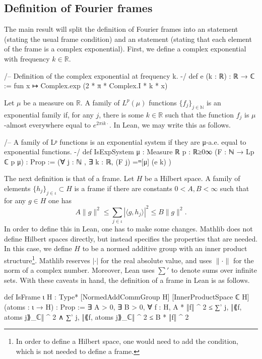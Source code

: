 \documentclass[reqno,a4paper,12pt]{amsart}
\def\R{{\mathbb R}}
\begin{document}
\subsection{Definition of Fourier frames}
\label{sec:fourier_frames}
The main result will split the definition of Fourier frames into an  statement (stating the usual frame condition) and an  statement (stating that each element of the frame is a complex exponential). First, we define a complex exponential with frequency $k \in \R$.

\begin{leancode}
/-- Definition of the complex exponential at frequency k. -/
def e (k : ℝ) : ℝ → ℂ := 
  fun x ↦ Complex.exp (2 * π * Complex.I * k * x)
\end{leancode}

Let $\mu$ be a measure on $\mathbb{R}$. A family of $L^p(\mu)$ functions $\{f_j\}_{j\in \mathbb{N}}$ is an exponential family if, for any $j$, there is some $k \in \R$ such that the function $f_j$ is $\mu$-almost everywhere equal to $e^{2\pi i k \cdot}$. In Lean, we may write this as follows.

\begin{leancode}
/-- A family of Lᵖ functions is an exponential system if they are
    μ-a.e. equal to exponential functions. -/
def IsExpSystem {μ : Measure ℝ} {p : ℝ≥0∞} (F : ℕ → Lp ℂ p μ) : Prop :=
   (∀ j : ℕ , ∃ k : ℝ, (F j) =ᵐ[μ] (e k) )
\end{leancode}

The next definition is that of a frame. Let $H$ be a Hilbert space. A family of elements $\{h_j\}_{j \in \iota} \subset H$ is a frame if there are constants $0<A,B<\infty$ such that for any $g\in H$ one has
$$
A \|g\|^2 \le \sum_{j \in \iota}|\langle g, h_j\rangle|^2 \le B \|g\|^2.
$$
In order to define this in Lean, one has to make some changes. Mathlib does not define Hilbert spaces directly, but instead specifies the properties that are needed. In this case, we define $H$ to be a normed additive group with an inner product structure\footnote{In order to define a Hilbert space, one would need to add the \lean{[CompleteSpace E]} condition, which is not needed to define a frame.}. Mathlib reserves $|\cdot|$ for the real absolute value, and uses $\|\cdot\|$ for the norm of a complex number. Moreover, Lean uses $∑'$ to denote sums over infinite sets. With these caveats in hand, the definition of a frame in Lean is as follows.
\begin{leancode}
def IsFrame {ι H : Type*} [NormedAddCommGroup H] [InnerProductSpace ℂ H]
    (atoms : ι → H) : Prop :=
  ∃ A > 0, ∃ B > 0,
    ∀ f : H,
      A * ‖f‖ ^ 2 ≤ ∑' j, ‖⟪f, atoms j⟫_ℂ‖ ^ 2 ∧
      ∑' j, ‖⟪f, atoms j⟫_ℂ‖ ^ 2 ≤ B * ‖f‖ ^ 2
\end{leancode}
\end{document}
